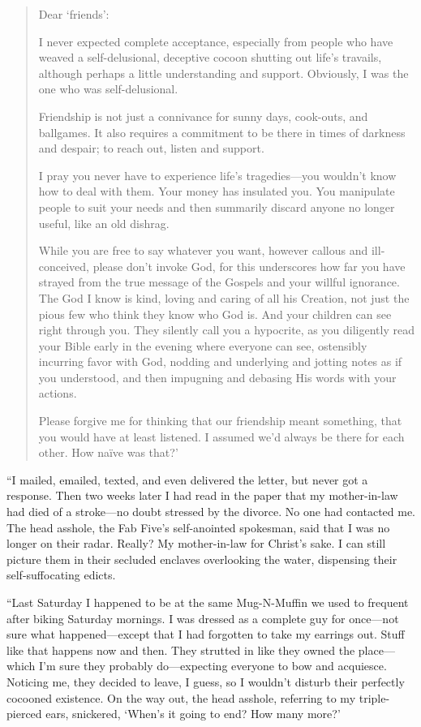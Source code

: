 \begin{quote}
Dear `friends':

I never expected complete acceptance, especially from people who have
weaved a self-delusional, deceptive cocoon shutting out life's travails,
although perhaps a little understanding and support. Obviously, I was
the one who was self-delusional.

Friendship is not just a connivance for sunny days, cook-outs, and
ballgames. It also requires a commitment to be there in times of
darkness and despair; to reach out, listen and support.

I pray you never have to experience life's tragedies---you wouldn't know
how to deal with them. Your money has insulated you. You manipulate
people to suit your needs and then summarily discard anyone no longer
useful, like an old dishrag.

While you are free to say whatever you want, however callous and
ill-conceived, please don't invoke God, for this underscores how far you
have strayed from the true message of the Gospels and your willful
ignorance. The God I know is kind, loving and caring of all his
Creation, not just the pious few who think they know who God is. And
your children can see right through you. They silently call you a
hypocrite, as you diligently read your Bible early in the evening where
everyone can see, ostensibly incurring favor with God, nodding and
underlying and jotting notes as if you understood, and then impugning
and debasing His words with your actions.

Please forgive me for thinking that our friendship meant something, that
you would have at least listened. I assumed we'd always be there for
each other. How naïve was that?'
\end{quote}

\noindent ``I mailed, emailed, texted, and even delivered the letter, but
never got a response. Then two weeks later I had read in the paper that
my mother-in-law had died of a stroke---no doubt stressed by the
divorce. No one had contacted me. The head asshole, the Fab Five's
self-anointed spokesman, said that I was no longer on their radar.
Really? My mother-in-law for Christ's sake. I can still picture them in
their secluded enclaves overlooking the water, dispensing their
self-suffocating edicts.

``Last Saturday I happened to be at the same Mug-N-Muffin we used to
frequent after biking Saturday mornings. I was dressed as a complete guy
for once---not sure what happened---except that I had forgotten to take
my earrings out. Stuff like that happens now and then. They strutted in
like they owned the place---which I'm sure they probably do---expecting
everyone to bow and acquiesce. Noticing me, they decided to leave, I
guess, so I wouldn't disturb their perfectly cocooned existence. On the
way out, the head asshole, referring to my triple-pierced ears,
snickered, `When's it going to end? How many more?'

